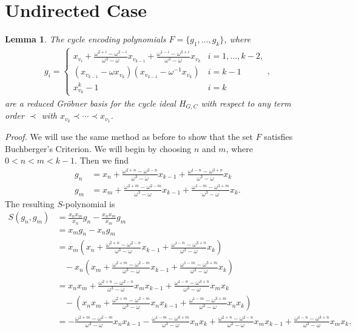 \documentclass[letterpaper]{article}
\newtheorem*{lemma}{Lemma}
\newcommand{\aln}[1]{\begin{align*} #1 \end{align*}} %
\newcommand{\fitp}[1]{\left( #1 \right)} %
\begin{document}
\section{Undirected Case}
\begin{lemma}
  The cycle encoding polynomials $F = \{g_1, \ldots, g_k\}$, where
  \aln{
    g_i = \left\{\begin{array}{ll} x_{v_i} + \frac{\omega^{2+i} - \omega^{2-i}}{\omega^3 - \omega} x_{v_{k-1}} + \frac{\omega^{1-i} - \omega^{3+i}}{\omega^3 - \omega} x_{v_k} & i = 1,\ldots,k-2,\\
                                (x_{v_{k-1}} - \omega x_{v_k}) (x_{v_{k-1}} - \omega^{-1} x_{v_k}) & i = k-1\\
                                x_{v_k}^k - 1 & i = k \end{array} \right.,
  }
  are a reduced Gr\"obner basis for the cycle ideal $H_{G,C}$ with respect to any term order $\prec$ with $x_{v_k} \prec \cdots \prec x_{v_1}$.
\end{lemma}
\noindent \textit{Proof.} We will use the same method as before to show that the set $F$ satisfies Buchberger's Criterion. We will begin by choosing $n$ and $m$, where $0 < n < m < k-1$. Then we find
\aln{
  g_n &= x_n + \frac{\omega^{2+n} - \omega^{2-n}}{\omega^3-\omega} x_{k-1} + \frac{\omega^{1-n} - \omega^{3+n}}{\omega^3 - \omega} x_k\\
  g_m &= x_m + \frac{\omega^{2+m} - \omega^{2-m}}{\omega^3-\omega} x_{k-1} + \frac{\omega^{1-m} - \omega^{3+m}}{\omega^3 - \omega} x_k.
}
The resulting $S$-polynomial is
\aln{
  S(g_n, g_m) &= \frac{x_n x_m}{x_n} g_n - \frac{x_n x_m}{x_m} g_m\\
  &= x_m g_n - x_n g_m\\
  &= x_m \fitp{x_n + \frac{\omega^{2+n} - \omega^{2-n}}{\omega^3-\omega} x_{k-1} + \frac{\omega^{1-n} - \omega^{3+n}}{\omega^3 - \omega} x_k}\\&~~~~ - x_n \fitp{x_m + \frac{\omega^{2+m} - \omega^{2-m}}{\omega^3-\omega} x_{k-1} + \frac{\omega^{1-m} - \omega^{3+m}}{\omega^3 - \omega} x_k}\\
  &= x_n x_m + \frac{\omega^{2+n} - \omega^{2-n}}{\omega^3-\omega} x_m x_{k-1} + \frac{\omega^{1-n} - \omega^{3+n}}{\omega^3 - \omega} x_m x_k\\&~~~~ - \fitp{x_n x_m + \frac{\omega^{2+m} - \omega^{2-m}}{\omega^3-\omega} x_n x_{k-1} + \frac{\omega^{1-m} - \omega^{3+m}}{\omega^3 - \omega} x_n x_k}\\
  &= - \frac{\omega^{2+m} - \omega^{2-m}}{\omega^3-\omega} x_n x_{k-1} - \frac{\omega^{1-m} - \omega^{3+m}}{\omega^3 - \omega} x_n x_k + \frac{\omega^{2+n} - \omega^{2-n}}{\omega^3-\omega} x_m x_{k-1} + \frac{\omega^{1-n} - \omega^{3+n}}{\omega^3 - \omega} x_m x_k.
}
\end{document}
